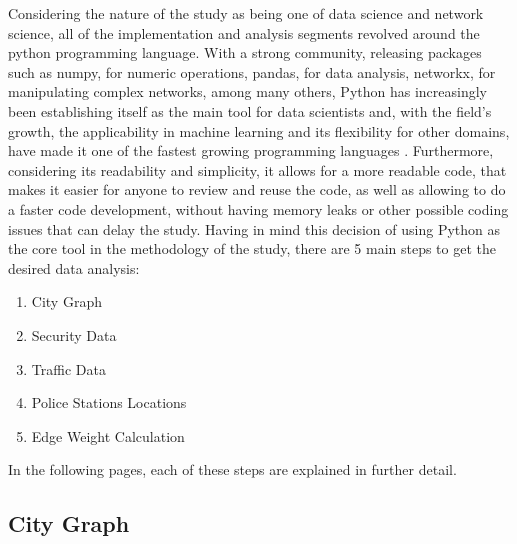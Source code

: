 \documentclass[runningheads]{llncs}
\begin{document}
Considering the nature of the study as being one of data science and network science, all of the implementation and analysis segments revolved around the python programming language. With a strong community, releasing packages such as numpy, for numeric operations, pandas, for data analysis, networkx, for manipulating complex networks, among many others, Python has increasingly been establishing itself as the main tool for data scientists and, with the field's growth, the applicability in machine learning and its flexibility for other domains, have made it one of the fastest growing programming languages \cite{robinson_why_2017}. Furthermore, considering its readability and simplicity, it allows for a more readable code, that makes it easier for anyone to review and reuse the code, as well as allowing to do a faster code development, without having memory leaks or other possible coding issues that can delay the study. Having in mind this decision of using Python as the core tool in the methodology of the study, there are 5 main steps to get the desired data analysis:

\begin{enumerate}
	\item City Graph
    
    \item Security Data
    
    \item Traffic Data
    
    \item Police Stations Locations
    
    \item Edge Weight Calculation
\end{enumerate}

In the following pages, each of these steps are explained in further detail.

\subsection{City Graph}
\end{document}
